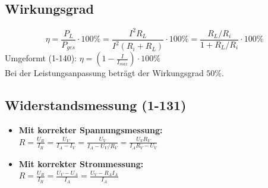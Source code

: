 \documentclass[a4paper, 6pt, landscape]{scrartcl}
\begin{document}
\begin{multicols*}{4}
				\subsection{Wirkungsgrad}
				$$\eta=\frac{P_L}{P_{ges}}\cdot 100\%=\frac{I^2R_L}{I^2(R_i+R_L)}\cdot 100\%=\frac{R_L/R_i}{1+R_L/R_i}\cdot 100\%$$
				Umgeformt (1-140): $\eta=\left(1-\frac{I}{I_{max}}\right)\cdot 100\%$\\

				Bei der Leistungsanpassung beträgt der Wirkungsgrad $50\%$.\\
				\subsection{Widerstandsmessung (1-131)}
				\begin{itemize}
					\item \textbf{Mit korrekter Spannungsmessung:}\\
					$R=\frac{U_R}{I_R}=\frac{U_V}{I_A-I_V}=\frac{U_V}{I_A-U_V/R_V}=\frac{U_VR_V}{I_AR_V-U_V}$
					\item \textbf{Mit korrekter Strommessung:}\\
					$R=\frac{U_R}{I_R}=\frac{U_V-U_A}{I_A}=\frac{U_V-R_AI_A}{I_A}$
				\end{itemize}


\end{multicols*}
\end{document}

